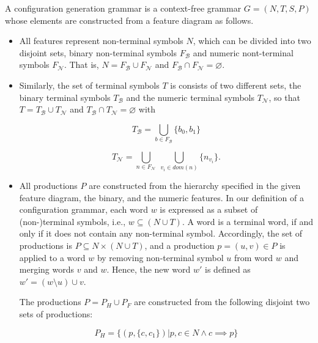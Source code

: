 \begin{definition}\label{def:cgg}
A configuration generation grammar is a context-free grammar $G = (N, T, S,
P)$ whose elements are constructed from a feature diagram as follows.

\begin{itemize}
  \item All features represent non-terminal symbols $N$, which can be divided
  into two disjoint sets, binary non-terminal symbols $F_\mathcal{B}$ and
  numeric nont-terminal symbols $F_\mathcal{N}$. That is, $N = F_\mathcal{B}
  \cup F_\mathcal{N}$ and $F_\mathcal{B} \cap F_\mathcal{N} = \varnothing$.

  \item Similarly, the set of terminal symbols $T$ is consists of two different
  sets, the binary terminal symbols $T_\mathcal{B}$ and the numeric terminal
  symbols $T_\mathcal{N}$, so that $T = T_\mathcal{B} \cup T_\mathcal{N}$ and
  $T_\mathcal{B} \cap T_\mathcal{N} = \varnothing$ with
  
  \begin{equation}
  T_\mathcal{B} = \bigcup_{b\in F_\mathcal{B}} \lbrace b_0,  b_1\rbrace
  \end{equation}
  
  \begin{equation}
  T_\mathcal{N} = \bigcup_{n\in F_\mathcal{N}} ~ \bigcup_{v_i \in dom(n)}
  \lbrace n_{v_i}\rbrace.
  \end{equation}
  
  \item All productions $P$ are constructed from the hierarchy specified in the
  given feature diagram, the binary, and the numeric features. In our definition
  of a configuration grammar, each word $w$ is expressed as a subset of
  (non-)terminal symbols, i.e., $w \subseteq (N \cup T)$. A word is a terminal
  word, if and only if it does not contain any non-terminal symbol. Accordingly,
  the set of productions is $P \subseteq N \times (N \cup T)$, and a production
  $p = (u, v) \in P$ is applied to a word $w$ by removing non-terminal symbol
  $u$ from word $w$ and merging words $v$ and $w$. Hence, the new word $w'$ is
  defined as $w' = (w \setminus u) \cup v$.

  The productions $P = P_H \cup P_F$ are constructed from the following disjoint
  two sets of productions:
  
  \begin{equation}
  P_H = \lbrace (p, \lbrace c, c_1 \rbrace) | p, c \in N \land
  c \implies p\rbrace
  \end{equation}
  

\end{itemize}
\end{definition}
